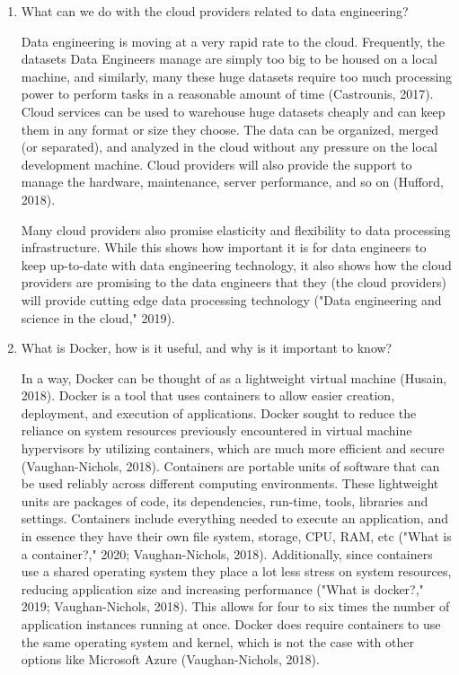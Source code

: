 \documentclass[]{article}
\begin{document}
\begin{enumerate}
\item What can we do with the cloud providers related to data engineering?

Data engineering is moving at a very rapid rate to the cloud.  Frequently, the datasets Data Engineers manage are simply too big to be housed on a local machine, and similarly, many these huge datasets require too much processing power to perform tasks in a reasonable amount of time (Castrounis, 2017).  Cloud services can be used to warehouse huge datasets cheaply and can keep them in any format or size they choose.  The data can be organized, merged (or separated), and analyzed in the cloud without any pressure on the local development machine.  Cloud providers will also provide the support to manage the hardware, maintenance, server performance, and so on (Hufford, 2018).  

Many cloud providers also promise elasticity and flexibility to data processing infrastructure.  While this shows how important it is for data engineers to keep up-to-date with data engineering technology, it also shows how the cloud providers are promising to the data engineers that they (the cloud providers) will provide cutting edge data processing technology ("Data engineering and science in the cloud," 2019).



\item What is Docker, how is it useful, and why is it important to know?

In a way, Docker can be thought of as a lightweight virtual machine (Husain, 2018).  Docker is a tool that uses containers to allow easier creation, deployment, and execution of applications.  Docker sought to reduce the reliance on system resources previously encountered in virtual machine hypervisors by utilizing containers, which are much more efficient and secure (Vaughan-Nichols, 2018).  Containers are portable units of software that can be used reliably across different computing environments.  These lightweight units are packages of code, its dependencies, run-time, tools, libraries and settings.  Containers include everything needed to execute an application, and in essence they have their own file system, storage, CPU, RAM, etc ("What is a container?," 2020; Vaughan-Nichols, 2018).  Additionally, since containers use a shared operating system they place a lot less stress on system resources, reducing application size and increasing performance ("What is docker?," 2019; Vaughan-Nichols, 2018).  This allows for four to six times the number of application instances running at once.  Docker does require containers to use the same operating system and kernel, which is not the case with other options like Microsoft Azure (Vaughan-Nichols, 2018).


\end{enumerate}
\end{document}
